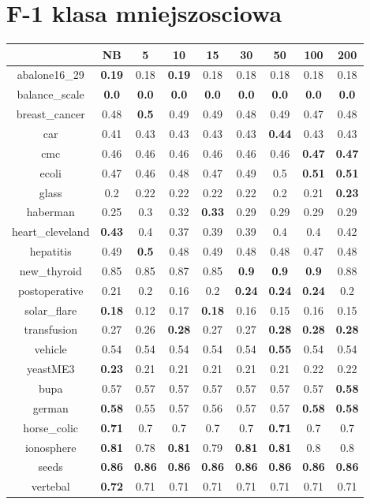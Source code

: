\documentclass{article}%
\begin{document}
%
\section*{F{-}1 klasa mniejszosciowa}%
\begin{tabular}{c|cccccccc}%
\hline%
&NB&5&10&15&30&50&100&200\\%
\hline%
abalone16\_29&\textbf{0.19}&0.18&\textbf{0.19}&0.18&0.18&0.18&0.18&0.18\\%
\hline%
balance\_scale&\textbf{0.0}&\textbf{0.0}&\textbf{0.0}&\textbf{0.0}&\textbf{0.0}&\textbf{0.0}&\textbf{0.0}&\textbf{0.0}\\%
\hline%
breast\_cancer&0.48&\textbf{0.5}&0.49&0.49&0.48&0.49&0.47&0.48\\%
\hline%
car&0.41&0.43&0.43&0.43&0.43&\textbf{0.44}&0.43&0.43\\%
\hline%
cmc&0.46&0.46&0.46&0.46&0.46&0.46&\textbf{0.47}&\textbf{0.47}\\%
\hline%
ecoli&0.47&0.46&0.48&0.47&0.49&0.5&\textbf{0.51}&\textbf{0.51}\\%
\hline%
glass&0.2&0.22&0.22&0.22&0.22&0.2&0.21&\textbf{0.23}\\%
\hline%
haberman&0.25&0.3&0.32&\textbf{0.33}&0.29&0.29&0.29&0.29\\%
\hline%
heart\_cleveland&\textbf{0.43}&0.4&0.37&0.39&0.39&0.4&0.4&0.42\\%
\hline%
hepatitis&0.49&\textbf{0.5}&0.48&0.49&0.48&0.48&0.47&0.48\\%
\hline%
new\_thyroid&0.85&0.85&0.87&0.85&\textbf{0.9}&\textbf{0.9}&\textbf{0.9}&0.88\\%
\hline%
postoperative&0.21&0.2&0.16&0.2&\textbf{0.24}&\textbf{0.24}&\textbf{0.24}&0.2\\%
\hline%
solar\_flare&\textbf{0.18}&0.12&0.17&\textbf{0.18}&0.16&0.15&0.16&0.15\\%
\hline%
transfusion&0.27&0.26&\textbf{0.28}&0.27&0.27&\textbf{0.28}&\textbf{0.28}&\textbf{0.28}\\%
\hline%
vehicle&0.54&0.54&0.54&0.54&0.54&\textbf{0.55}&0.54&0.54\\%
\hline%
yeastME3&\textbf{0.23}&0.21&0.21&0.21&0.21&0.21&0.22&0.22\\%
\hline%
bupa&0.57&0.57&0.57&0.57&0.57&0.57&0.57&\textbf{0.58}\\%
\hline%
german&\textbf{0.58}&0.55&0.57&0.56&0.57&0.57&\textbf{0.58}&\textbf{0.58}\\%
\hline%
horse\_colic&\textbf{0.71}&0.7&0.7&0.7&0.7&\textbf{0.71}&0.7&0.7\\%
\hline%
ionosphere&\textbf{0.81}&0.78&\textbf{0.81}&0.79&\textbf{0.81}&\textbf{0.81}&0.8&0.8\\%
\hline%
seeds&\textbf{0.86}&\textbf{0.86}&\textbf{0.86}&\textbf{0.86}&\textbf{0.86}&\textbf{0.86}&\textbf{0.86}&\textbf{0.86}\\%
\hline%
vertebal&\textbf{0.72}&0.71&0.71&0.71&0.71&0.71&0.71&0.71\\%
\hline%
\end{tabular}
\end{document}
